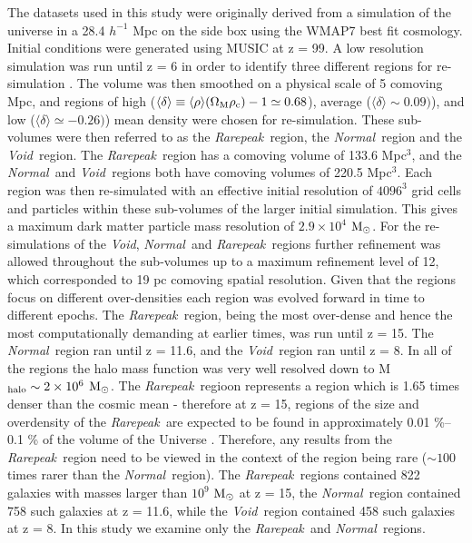 \documentclass[graphics, twocolumn, usenatbib]{mn2e}
\newcommand{\mpch} {\rm $h^{-1}$ Mpc\,\,}
\newcommand{\msolar} {$\rm{M_{\odot}}~$}
\newcommand{\msolarc} {$\rm{M_{\odot}}$}
\newcommand{\rarepeak} {\textit{Rarepeak~}}
\newcommand{\normal} {\textit{Normal~}}
\newcommand{\void} {\textit{Void~}}
\newcommand{\voidc} {\textit{Void}}
\begin{document}
The datasets used in this study were originally derived from a simulation of the universe in a 28.4
\mpch on the side box using the WMAP7 best fit cosmology. Initial conditions were generated using
MUSIC \citep{Hahn_2011} at z = 99. A low resolution simulation was run until z = 6 in order to
identify three different regions for re-simulation \citep{Chen_2014}. The volume was then smoothed
on a physical scale of 5 comoving Mpc, and regions of high
($\langle\delta\rangle \equiv \langle\rho\rangle(\Omega_{\rm M} \rho_{\rm c}) - 1 \simeq 0.68$),
average ($\langle\delta\rangle \sim 0.09)$), and low ($\langle\delta\rangle \simeq -0.26)$)
mean density were chosen for re-simulation. These sub-volumes were then referred to as the
\rarepeak region, the \normal region  and the \void region. The \rarepeak region has a comoving
volume of 133.6 Mpc$^3$, and the \normal and \void regions both have comoving volumes of 220.5
Mpc$^3$. Each region was then re-simulated with an effective initial resolution of $4096^3$ grid
cells and particles within these sub-volumes of the larger initial simulation. This gives a maximum
dark matter particle mass resolution of $2.9 \times 10^4$ \msolarc. For the re-simulations of the
\voidc, \normal and \rarepeak regions further refinement was allowed throughout the sub-volumes up
to a maximum refinement level of 12, which corresponded to 19 pc comoving spatial resolution. Given
that the regions focus on different over-densities each region was evolved forward in time to
different epochs. The \rarepeak region, being the most over-dense and hence the most
computationally demanding at earlier times, was run until z = 15. The \normal region ran until z =
11.6, and the \void region ran until z = 8. In all of the regions the halo mass function was very
well resolved down to M$_{\rm halo} \sim 2 \times 10^6$ \msolarc. The \rarepeak regioon represents a
region which is 1.65 times denser than the cosmic mean - therefore at z = 15, regions of the
size and overdensity of the \rarepeak are expected to be found in approximately 0.01 \%–0.1 \%
of the volume of the Universe \citep{Wise_2019}. Therefore, any results from the
\rarepeak region need to be viewed in the context of the region being rare ($\sim 100$ times
rarer than the \normal region).
The \rarepeak regions contained
822 galaxies with masses larger than $10^9$ \msolar at z = 15, the \normal region contained 758
such galaxies at z = 11.6, while the \void region contained 458 such galaxies at z = 8.
In this study we examine only the \rarepeak and \normal regions.
\end{document}
